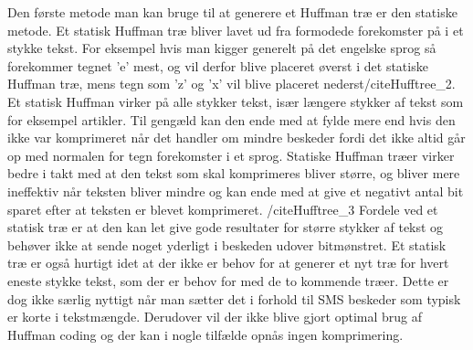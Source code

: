 Den første metode man kan bruge til at generere et Huffman træ er den statiske metode. Et statisk Huffman træ bliver lavet ud fra formodede forekomster på i et stykke tekst. For eksempel hvis man kigger generelt på det engelske sprog så forekommer tegnet ’e’ mest, og vil derfor blive placeret øverst i det statiske Huffman træ, mens tegn som ’z’ og ’x’ vil blive placeret nederst/cite{Hufftree_2}.
Et statisk Huffman virker på alle stykker tekst, især længere stykker af tekst som for eksempel artikler. Til gengæld kan den ende med at fylde mere end hvis den ikke var komprimeret når det handler om mindre beskeder fordi det ikke altid går op med normalen for tegn forekomster i et sprog. Statiske Huffman træer virker bedre i takt med at den tekst som skal komprimeres bliver større, og bliver mere ineffektiv når teksten bliver mindre og kan ende med at give et negativt antal bit sparet efter at teksten er blevet komprimeret. /cite{Hufftree_3}
Fordele ved et statisk træ er at den kan let give gode resultater for større stykker af tekst og behøver ikke at sende noget yderligt i beskeden udover bitmønstret. Et statisk træ er også hurtigt idet at der ikke er behov for at generer et nyt træ for hvert eneste stykke tekst, som der er behov for med de to kommende træer. Dette er dog ikke særlig nyttigt når man sætter det i forhold til SMS beskeder som typisk er korte i tekstmængde. Derudover vil der ikke blive gjort optimal brug af Huffman coding og der kan i nogle tilfælde opnås ingen komprimering.